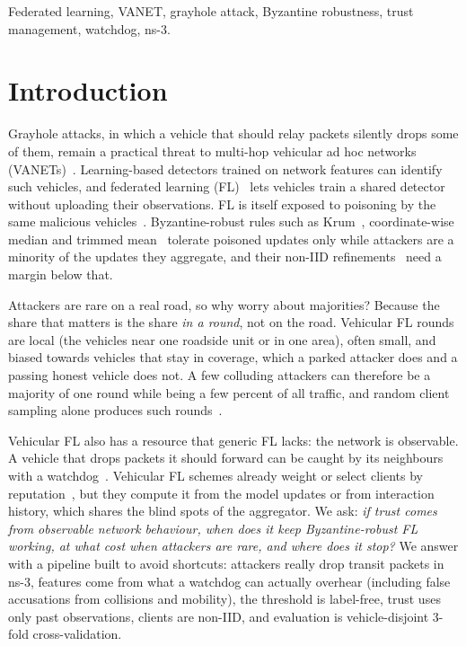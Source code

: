 \documentclass[conference]{IEEEtran}
\begin{document}
\begin{IEEEkeywords}
Federated learning, VANET, grayhole attack, Byzantine robustness, trust management, watchdog, ns-3.
\end{IEEEkeywords}

\section{Introduction}

Grayhole attacks, in which a vehicle that should relay packets silently drops some of them, remain a practical
threat to multi-hop vehicular ad hoc networks (VANETs)~\cite{vanderheijden2019}. Learning-based detectors trained on network features can
identify such vehicles, and federated learning (FL)~\cite{mcmahan2017} lets vehicles train a shared detector without
uploading their observations. FL is itself exposed to poisoning by the same malicious vehicles~\cite{fang2020local,tolpegin2020}. Byzantine-robust
rules such as Krum~\cite{blanchard2017}, coordinate-wise median and trimmed mean~\cite{yin2018} tolerate poisoned
updates only while attackers are a minority of the updates they aggregate, and their non-IID
refinements~\cite{karimireddy2022} need a margin below that.

Attackers are rare on a real road, so why worry about majorities? Because the share that matters is the share
\emph{in a round}, not on the road. Vehicular FL rounds are local (the vehicles near one roadside unit or in one
area), often small, and biased towards vehicles that stay in coverage, which a parked
attacker does and a passing honest vehicle does not. A few colluding attackers can therefore be a majority of one
round while being a few percent of all traffic, and random client sampling alone produces such rounds~\cite{allouah2024}.

Vehicular FL also has a resource that generic FL lacks: the network is observable. A vehicle that drops packets it
should forward can be caught by its neighbours with a watchdog~\cite{marti2000}. Vehicular FL schemes already weight
or select clients by reputation~\cite{su2025electronics,titsrc2026,vnc2024hfl,iwcmc2025trust,vnc2026sdv}, but they
compute it from the model updates or from interaction history, which shares the blind spots of the aggregator. We
ask: \emph{if trust comes from observable network behaviour, when does it keep Byzantine-robust FL working, at what
cost when attackers are rare, and where does it stop?} We answer with a pipeline built to avoid shortcuts: attackers
really drop transit packets in ns-3, features come from what a watchdog can actually overhear (including false
accusations from collisions and mobility), the threshold is label-free, trust uses only past observations, clients
are non-IID, and evaluation is vehicle-disjoint 3-fold cross-validation.
\end{document}

